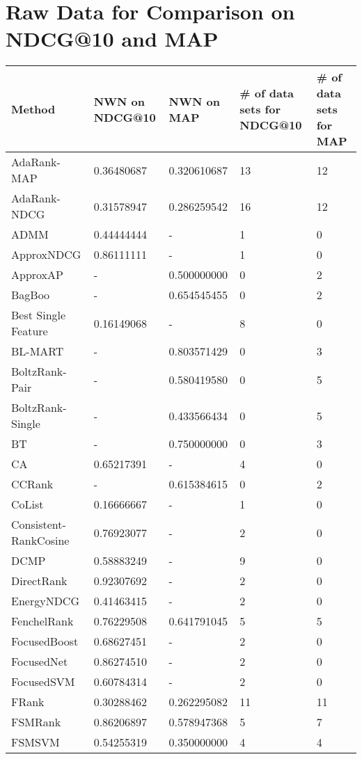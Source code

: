 \chapter{Raw Data for Comparison on NDCG@10 and MAP}
\label{app:norm_winnum_ndcg10map}

\begin{longtable}{l|p{2.3cm}|p{2.3cm}|p{2.3cm}|p{2.33cm}}
Method & \acs{NWN} on \acs{NDCG}@10 & \acs{NWN} on \acs{MAP} & \# of data sets for \acs{NDCG}@10 & \# of data sets for \acs{MAP}\\
\hline
AdaRank-\acs{MAP} & 0.36480687 & 0.320610687 & 13 & 12\\ 
AdaRank-\acs{NDCG} & 0.31578947 & 0.286259542 & 16 & 12 \\ 
\acs{ADMM} & 0.44444444 & - & 1 & 0 \\ 
Approx\acs{NDCG} & 0.86111111 & - & 1 & 0 \\
Approx\acs{AP} & - & 0.500000000 & 0 & 2 \\
BagBoo & - & 0.654545455 & 0 & 2 \\ 
Best Single Feature & 0.16149068 & - & 8 & 0 \\
BL-MART & - & 0.803571429 & 0 & 3 \\
BoltzRank-Pair & - & 0.580419580 & 0 & 5 \\ 
BoltzRank-Single & - & 0.433566434 & 0 & 5 \\ 
BT & - & 0.750000000 & 0 & 3 \\ 
CA & 0.65217391 & - & 4 & 0 \\
CCRank & - & 0.615384615 & 0 & 2 \\ 
CoList & 0.16666667 & - & 1 & 0 \\ 
Consistent-RankCosine & 0.76923077 & - & 2 & 0 \\ 
DCMP & 0.58883249 & - & 9 & 0 \\ 
DirectRank & 0.92307692 & - & 2 & 0 \\ 
Energy\acs{NDCG} & 0.41463415 & - & 2 & 0 \\ 
FenchelRank & 0.76229508 & 0.641791045 & 5 & 5 \\ 
FocusedBoost & 0.68627451 & - & 2 & 0 \\ 
FocusedNet & 0.86274510 & - & 2 & 0 \\ 
Focused\acs{SVM} & 0.60784314 & - & 2 & 0 \\ 
FRank & 0.30288462 & 0.262295082 & 11 & 11 \\ 
FSMRank & 0.86206897 & 0.578947368 & 5 & 7 \\ 
FSM\acs{SVM} & 0.54255319 & 0.350000000 & 4 & 4 \\ 

\end{longtable}
